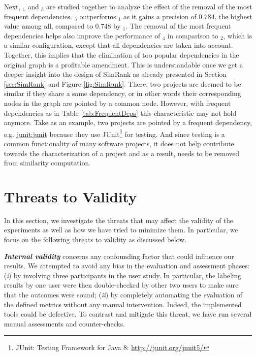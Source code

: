 Next, \CrossSimA$_{1}$ and \CrossSimA$_{3}$ are studied together to analyze the effect of the removal of the most frequent dependencies. \CrossSimA$_{3}$ outperforms \CrossSimA$_{1}$ as it gains a precision of $0.784$, the highest value among all, compared to $0.748$ by \CrossSimA$_{1}$. The removal of the most frequent dependencies helps also improve the performance of \CrossSimA$_{4}$ in comparison to \CrossSimA$_{2}$, which is a similar configuration, except that all dependencies are taken into account. Together, this implies that the elimination of too popular dependencies in the original graph is a profitable amendment. This is understandable once we get a deeper insight into the design of SimRank as already presented in Section \ref{sec:SimRank} and Figure \ref{fig:SimRank}. There, two projects are deemed to be similar if they share a same dependency, or in other words their corresponding nodes in the graph are pointed by a common node. However, with frequent dependencies as in Table \ref{tab:FrequentDeps} this characteristic may not hold anymore. Take as an example, two projects are pointed by a frequent dependency, e.g. \href{https://mvnrepository.com/artifact/junit/junit}{junit:junit} because they use JUnit\footnote{JUnit: Testing Framework for Java 8: \url{http://junit.org/junit5/}} for testing. And since testing is a common functionality of many software projects, it does not help contribute towards the characterization of a project and as a result, needs to be removed from similarity computation. 


\section{Threats to Validity}\label{sec:threatsValidity}

In this section, we investigate the threats that may affect the validity of the experiments as well as how we have tried to minimize them. In particular, we focus on the following threats to validity as discussed below. %

\textit{\textbf{Internal validity}}  concerns any confounding factor that could influence our results.  We attempted to avoid any bias in the evaluation and assessment
phases: (\emph{i}) by involving three participants in the user study. In particular, the labeling results by one user were then double-checked by other two users to make sure that the outcomes were sound; (\emph{ii}) by completely automating the evaluation of the defined metrics without any manual intervention. Indeed, the implemented tools could be defective. To contrast and mitigate this threat, we have run several manual assessments and counter-checks.

